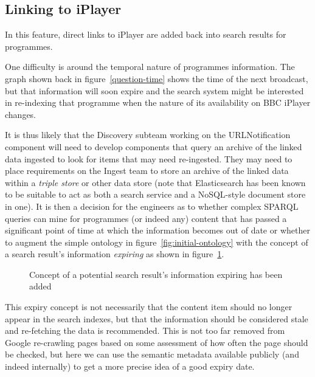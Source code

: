 \subsection{Linking to iPlayer}

In this feature, direct links to iPlayer are added back into
search results for programmes.

One difficulty is around
the temporal nature of programmes information. The graph
shown back in figure~\ref{question-time} shows
the time of the next broadcast, but that information will
soon expire and the search system might be interested in
re-indexing that programme when the nature of its availability
on BBC iPlayer changes.

It is thus likely that the Discovery subteam working on the
URLNotification component will need to develop components
that query an archive of the linked data ingested to look
for items that may need re-ingested. They may need to
place requirements on the Ingest team to store an archive
of the linked data within a \emph{triple store} or other
data store (note that Elasticsearch has been known to be
suitable to act as both a search service and a NoSQL-style
document store in one). It is then a decision for the
engineers as to whether complex SPARQL queries can mine
for programmes (or indeed any) content that has passed
a significant point of time at which the information becomes
out of date or whether to augment the simple ontology
in figure~\ref{fig:initial-ontology} with the concept of
a search result's information \emph{expiring} as shown in
figure~\ref{fig:expiring-ontology}.

\begin{figure}[t]
  \begin{center}
  \end{center}
  \caption{Concept of a potential search result's information expiring has been added}
  \label{fig:expiring-ontology}
\end{figure}

This expiry concept is not necessarily that the content item
should no longer appear in the search indexes, but that the
information should be considered stale and re-fetching the data
is recommended. This is not too far removed from Google
re-crawling pages based on some assessment of how often the page
should be checked, but here we can use the semantic metadata
available publicly (and indeed internally) to get a more
precise idea of a good expiry date.

